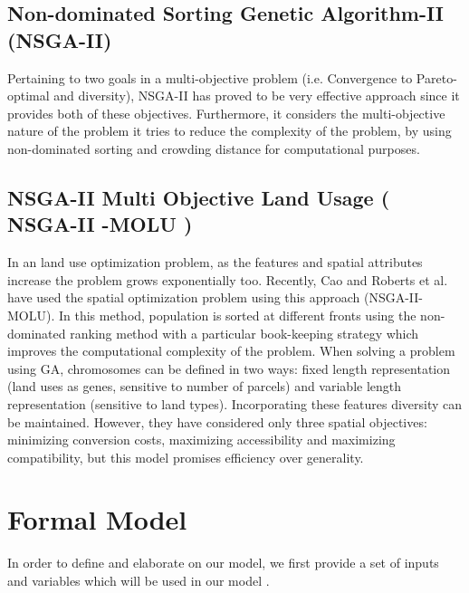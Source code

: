 \documentclass{sig-alternate}
\begin{document}
\subsection{Non-dominated Sorting Genetic Algorithm-II (NSGA-II)} Pertaining to two goals in a multi-objective problem (i.e. Convergence to Pareto-optimal and diversity), NSGA-II has proved to be very effective approach since it provides both of these objectives. Furthermore, it considers the multi-objective nature of the problem it tries to reduce the complexity of the problem, by using non-dominated sorting and crowding distance for computational purposes.\\

\subsection{ NSGA-II Multi Objective Land Usage  ( NSGA-II -MOLU )} In an land use optimization problem, as the features and spatial attributes increase the problem grows exponentially too. Recently, Cao and Roberts et al. have used the spatial optimization problem using this approach (NSGA-II-MOLU). In this method, population is sorted at different fronts using the non-dominated ranking method with a particular book-keeping strategy which improves the computational complexity of the problem. When solving a problem using GA, chromosomes can be defined in two ways: fixed length representation (land uses as genes, sensitive to number of parcels) and variable length representation (sensitive to land types). Incorporating these features diversity can be maintained. However, they have considered only three spatial objectives: minimizing conversion costs, maximizing accessibility and maximizing compatibility, but this model promises efficiency over generality. \\

\section{Formal Model}

In order to define and elaborate on our model, we first provide a set of inputs and variables which will be used in our model .\\
\end{document}
